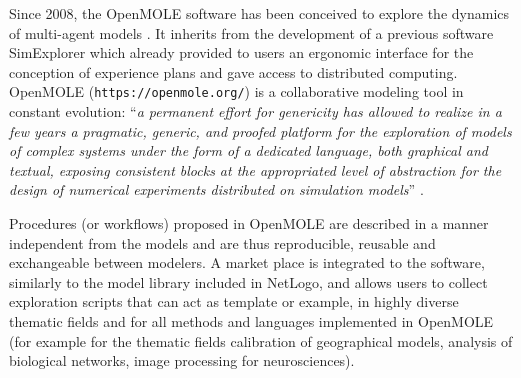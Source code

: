 \documentclass[10pt]{article}
\begin{document}
Since 2008, the OpenMOLE software has been conceived to explore the dynamics of multi-agent models \citep{}. It inherits from the development of a previous software SimExplorer \citep{} which already provided to users an ergonomic interface for the conception of experience plans and gave access to distributed computing. OpenMOLE (\texttt{https://openmole.org/}) is a collaborative modeling tool in constant evolution: ``\textit{a permanent effort for genericity has allowed to realize in a few years a pragmatic, generic, and proofed platform for the exploration of models of complex systems under the form of a dedicated language, both graphical and textual, exposing consistent blocks at the appropriated level of abstraction for the design of numerical experiments distributed on simulation models}'' \citep{}.


Procedures (or workflows) proposed in OpenMOLE are described in a manner independent from the models and are thus reproducible, reusable and exchangeable between modelers. A market place is integrated to the software, similarly to the model library included in NetLogo, and allows users to collect exploration scripts that can act as template or example, in highly diverse thematic fields and for all methods and languages implemented in OpenMOLE (for example for the thematic fields calibration of geographical models, analysis of biological networks, image processing for neurosciences).
\end{document}
